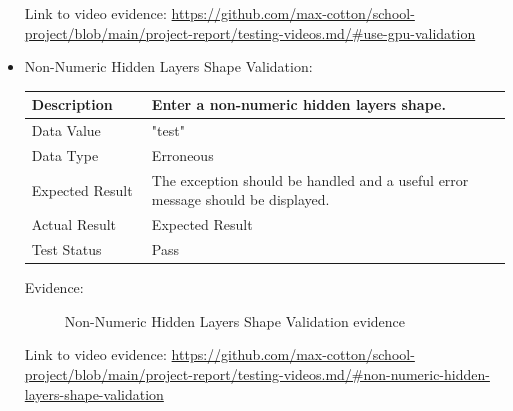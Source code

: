 \documentclass[./project-report/src/latex/project-report.tex]{subfiles}
\begin{document}
\begin{itemize}
		Link to video evidence: \url{https://github.com/max-cotton/school-project/blob/main/project-report/testing-videos.md/#use-gpu-validation}

	\pagebreak

	\item Non-Numeric Hidden Layers Shape Validation: \newline\newline
		\begin{tabular}{|p{0.25\linewidth}|p{0.75\linewidth}|}
			\hline
			Description & Enter a non-numeric hidden layers shape. \\
			\hline
			Data Value & "test" \\
			\hline
			Data Type & Erroneous \\
			\hline
			Expected Result & The exception should be handled and a useful error message should be displayed. \\
			\hline
			Actual Result & Expected Result \\
			\hline
			Test Status & Pass \\
			\hline
		\end{tabular}

		\vspace{5mm}

		Evidence:
		\begin{figure}[h!]
		\centering
		\caption{Non-Numeric Hidden Layers Shape Validation evidence}
		\end{figure}

		\begin{sloppypar}
		Link to video evidence: \url{https://github.com/max-cotton/school-project/blob/main/project-report/testing-videos.md/#non-numeric-hidden-layers-shape-validation}
		\end{sloppypar}


\end{itemize}
\end{document}
